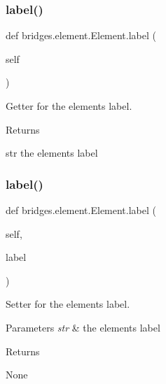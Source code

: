 \subsubsection{\texorpdfstring{label()}{label()}\hspace{0.1cm}{\footnotesize\ttfamily [1/2]}}
{\footnotesize\ttfamily def bridges.\+element.\+Element.\+label (\begin{DoxyParamCaption}\item[{}]{self }\end{DoxyParamCaption})}



Getter for the element\textquotesingle{}s label. 

\begin{DoxyReturn}{Returns}


str the element\textquotesingle{}s label 
\end{DoxyReturn}
\mbox{\label{classbridges_1_1element_1_1_element_a29dd33558e94464186658d2baad1d6c9}} 
\subsubsection{\texorpdfstring{label()}{label()}\hspace{0.1cm}{\footnotesize\ttfamily [2/2]}}
{\footnotesize\ttfamily def bridges.\+element.\+Element.\+label (\begin{DoxyParamCaption}\item[{}]{self,  }\item[{}]{label }\end{DoxyParamCaption})}



Setter for the element\textquotesingle{}s label. 


\begin{DoxyParams}{Parameters}
{\em str} & the element\textquotesingle{}s label \\
\hline
\end{DoxyParams}
\begin{DoxyReturn}{Returns}


None 
\end{DoxyReturn}
\mbox{\label{classbridges_1_1element_1_1_element_a31ce56c32bd400a2d8d0e7e146c4b5f3}} 
